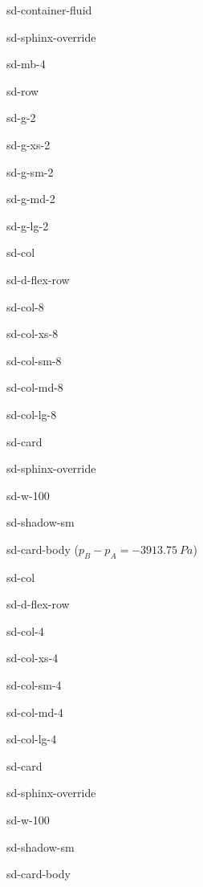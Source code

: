 \documentclass[letterpaper,10pt,italian]{jupyterBook}
\begin{document}
\begin{sphinxuseclass}{sd-container-fluid}
\begin{sphinxuseclass}{sd-sphinx-override}
\begin{sphinxuseclass}{sd-mb-4}
\begin{sphinxuseclass}{sd-row}
\begin{sphinxuseclass}{sd-g-2}
\begin{sphinxuseclass}{sd-g-xs-2}
\begin{sphinxuseclass}{sd-g-sm-2}
\begin{sphinxuseclass}{sd-g-md-2}
\begin{sphinxuseclass}{sd-g-lg-2}
\begin{sphinxuseclass}{sd-col}
\begin{sphinxuseclass}{sd-d-flex-row}
\begin{sphinxuseclass}{sd-col-8}
\begin{sphinxuseclass}{sd-col-xs-8}
\begin{sphinxuseclass}{sd-col-sm-8}
\begin{sphinxuseclass}{sd-col-md-8}
\begin{sphinxuseclass}{sd-col-lg-8}
\begin{sphinxuseclass}{sd-card}
\begin{sphinxuseclass}{sd-sphinx-override}
\begin{sphinxuseclass}{sd-w-100}
\begin{sphinxuseclass}{sd-shadow-sm}
\begin{sphinxuseclass}{sd-card-body}
\sphinxAtStartPar
(\(p_B-p_A=-3913.75\ Pa\))

\end{sphinxuseclass}
\end{sphinxuseclass}
\end{sphinxuseclass}
\end{sphinxuseclass}
\end{sphinxuseclass}
\end{sphinxuseclass}
\end{sphinxuseclass}
\end{sphinxuseclass}
\end{sphinxuseclass}
\end{sphinxuseclass}
\end{sphinxuseclass}
\end{sphinxuseclass}
\begin{sphinxuseclass}{sd-col}
\begin{sphinxuseclass}{sd-d-flex-row}
\begin{sphinxuseclass}{sd-col-4}
\begin{sphinxuseclass}{sd-col-xs-4}
\begin{sphinxuseclass}{sd-col-sm-4}
\begin{sphinxuseclass}{sd-col-md-4}
\begin{sphinxuseclass}{sd-col-lg-4}
\begin{sphinxuseclass}{sd-card}
\begin{sphinxuseclass}{sd-sphinx-override}
\begin{sphinxuseclass}{sd-w-100}
\begin{sphinxuseclass}{sd-shadow-sm}
\begin{sphinxuseclass}{sd-card-body}
\sphinxAtStartPar
{}


\end{sphinxuseclass}
\end{sphinxuseclass}
\end{sphinxuseclass}
\end{sphinxuseclass}
\end{sphinxuseclass}
\end{sphinxuseclass}
\end{sphinxuseclass}
\end{sphinxuseclass}
\end{sphinxuseclass}
\end{sphinxuseclass}
\end{sphinxuseclass}
\end{sphinxuseclass}
\end{sphinxuseclass}
\end{sphinxuseclass}
\end{sphinxuseclass}
\end{sphinxuseclass}
\end{sphinxuseclass}
\end{sphinxuseclass}
\end{sphinxuseclass}
\end{sphinxuseclass}
\end{sphinxuseclass}
\end{document}

